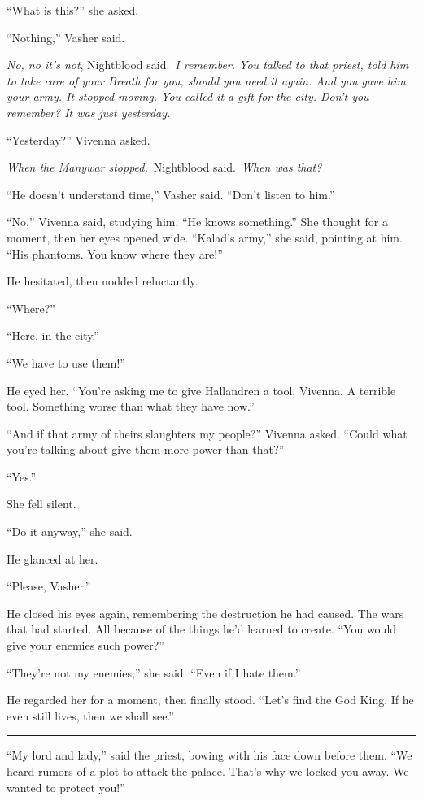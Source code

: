 “What is this?” she asked.

“Nothing,” Vasher said.

\textit{No, no it’s not}, Nightblood said.~\textit{I remember. You talked to that priest, told him to take care of your Breath for you, should you need it again. And you gave him your army. It stopped moving. You called it a gift for the city. Don’t you remember? It was just yesterday.}

“Yesterday?” Vivenna asked.

\textit{When the Manywar stopped,}~Nightblood said.~\textit{When was that?}

“He doesn’t understand time,” Vasher said. “Don’t listen to him.”

“No,” Vivenna said, studying him. “He knows something.” She thought for a moment, then her eyes opened wide. “Kalad’s army,” she said, pointing at him. “His phantoms. You know where they are!”

He hesitated, then nodded reluctantly.

“Where?”

“Here, in the city.”

“We have to use them!”

He eyed her. “You’re asking me to give Hallandren a tool, Vivenna. A terrible tool. Something worse than what they have now.”

“And if that army of theirs slaughters my people?” Vivenna asked. “Could what you’re talking about give them more power than that?”

“Yes.”

She fell silent.

“Do it anyway,” she said.

He glanced at her.

“Please, Vasher.”

He closed his eyes again, remembering the destruction he had caused. The wars that had started. All because of the things he’d learned to create. “You would give your enemies such power?”

“They’re not my enemies,” she said. “Even if I hate them.”

He regarded her for a moment, then finally stood. “Let’s find the God King. If he even still lives, then we shall see.”

\bigskip \hrule \bigskip

“My lord and lady,” said the priest, bowing with his face down before them. “We heard rumors of a plot to attack the palace. That’s why we locked you away. We wanted to protect you!”

